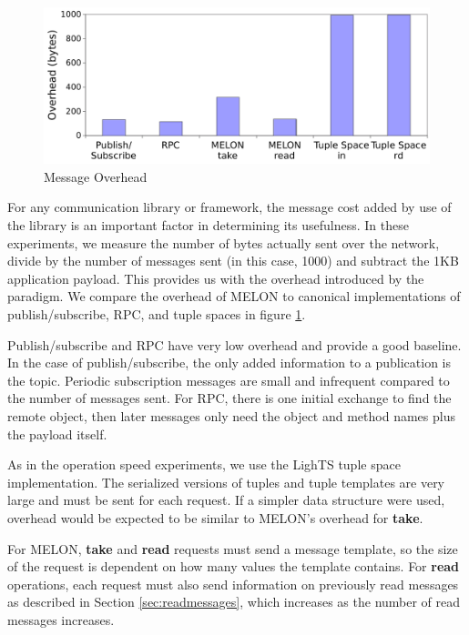\documentclass[lnicst]{svmultln}
\begin{document}
\begin{figure}
\centering
\includegraphics[scale = .50, clip, trim = 0px 0px 0px 0px]{figures/overhead.pdf}
\caption{Message Overhead}
\label{fig:overhead}
\end{figure}

For any communication library or framework, the message cost added by use of the library is an important factor in determining its usefulness. In these experiments, we measure the number of bytes actually sent over the network, divide by the number of messages sent (in this case, 1000) and subtract the 1KB application payload. This provides us with the overhead introduced by the paradigm. We compare the overhead of MELON to canonical implementations of publish/subscribe, RPC, and tuple spaces in figure \ref{fig:overhead}.

Publish/subscribe and RPC have very low overhead and provide a good baseline. In the case of publish/subscribe, the only added information to a publication is the topic. Periodic subscription messages are small and infrequent compared to the number of messages sent. For RPC, there is one initial exchange to find the remote object, then later messages only need the object and method names plus the payload itself.

As in the operation speed experiments, we use the LighTS tuple space implementation. The serialized versions of tuples and tuple templates are very large and must be sent for each request. If a simpler data structure were used, overhead would be expected to be similar to MELON's overhead for \textbf{take}.

For MELON, \textbf{take} and \textbf{read} requests must send a message template, so the size of the request is dependent on how many values the template contains. For \textbf{read} operations, each request must also send information on previously read messages as described in Section \ref{sec:readmessages}, which increases as the number of read messages increases.
\end{document}

